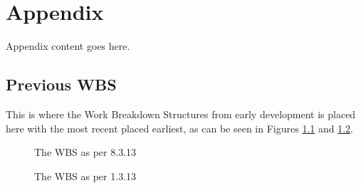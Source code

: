 \appendix

\chapter{Appendix}
Appendix content goes here.
\section{Previous WBS}
This is where the Work Breakdown Structures from early development is placed here with the most recent placed earliest, as can be seen in Figures \ref{fig:WBS83} and \ref{fig:WBS13}.
\begin{figure}[p]

\setlength\fboxsep{0pt}
\setlength\fboxrule{1pt}\noindent{}

\caption{The WBS as per 8.3.13}
\label{fig:WBS83}
\end{figure}

\begin{figure}[p]

\setlength\fboxsep{0pt}
\setlength\fboxrule{1pt}\noindent{}

\caption{The WBS as per 1.3.13}
\label{fig:WBS13}
\end{figure}


